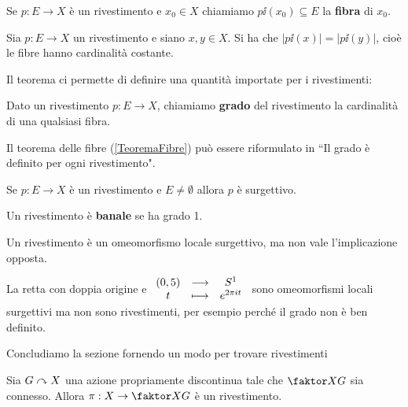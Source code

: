\begin{multicols*}{2}
\begin{definition}[Fibra]
Se $p:E\to X$ è un rivestimento e $x_0\in X$ chiamiamo $p\ii(x_0)\subseteq E$ la \textbf{fibra} di $x_0$.
\end{definition}

\begin{theorem}\label{TeoremaFibre}
Sia $p:E\to X$ un rivestimento e siano $x,y\in X$. Si ha che $|p\ii(x)|=|p\ii(y)|$, cioè le fibre hanno cardinalità costante.
\end{theorem}

\noindent Il teorema ci permette di definire una quantità importate per i rivestimenti:
\begin{definition}
Dato un rivestimento $p:E\to X$, chiamiamo \textbf{grado} del rivestimento la cardinalità di una qualsiasi fibra.
\end{definition}

\begin{remark}
Il teorema delle fibre (\ref{TeoremaFibre}) può essere riformulato in ``Il grado è definito per ogni rivestimento".
\end{remark}

\begin{remark}\label{RivestimentiSonoSurgettivi}
Se $p:E\to X$ è un rivestimento e $E\neq \emptyset$ allora $p$ è surgettivo.
\end{remark}

\begin{definition}
Un rivestimento è \textbf{banale} se ha grado 1.
\end{definition}

\begin{remark}
Un rivestimento è un omeomorfismo locale surgettivo, ma non vale l'implicazione opposta.
\end{remark}
\begin{example}
La retta con doppia origine e $\begin{array}{ccc} {(0,5)} & \longrightarrow & {S^1}\\ {t} & \longmapsto & {e^{2\pi it}} \end{array}$ sono omeomorfismi locali surgettivi ma non sono rivestimenti, per esempio perché il grado non è ben definito.
\end{example}

\noindent Concludiamo la sezione fornendo un modo per trovare rivestimenti
\begin{theorem}\label{ProiezioneQuozienteAzionePropriamenteDiscontinuaERivestimento}
Sia $G\curvearrowright X$ una azione propriamente discontinua tale che $\quot XG$ sia connesso. Allora $\pi:X\to\quot XG$ è un rivestimento.
\end{theorem}


\end{multicols*}
